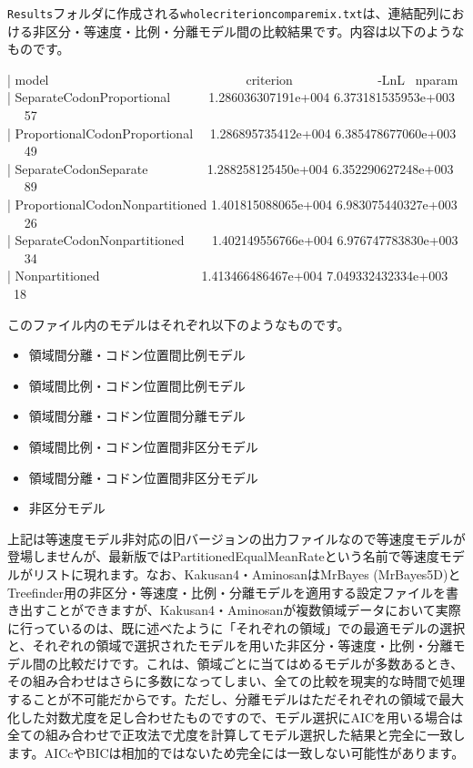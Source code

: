 \documentclass[titlepage,10pt,a4paper]{jsbook}
\newenvironment{content}{\begin{shaded}\vspace{-1em}\raggedright\ttfamily\footnotesize\setlength{\baselineskip}{1.4em}}{\end{shaded}\vspace{-1em}}
\begin{document}
\texttt{Results}フォルダに作成される\texttt{whole{\textunderscore}criterion{\textunderscore}comparemix.txt}は、連結配列における非区分・等速度・比例・分離モデル間の比較結果です。内容は以下のようなものです。
\begin{content}
| model~ ~ ~ ~ ~ ~ ~ ~ ~ ~ ~ ~ ~ ~ ~ ~ ~ ~ ~criterion~ ~ ~ ~ ~ ~ ~ ~ -LnL~ nparam\\
| Separate{\textunderscore}CodonProportional~ ~ ~ ~1.286036307191e+004 6.373181535953e+003~ ~ ~57\\
| Proportional{\textunderscore}CodonProportional~ ~1.286895735412e+004 6.385478677060e+003~ ~ ~49\\
| Separate{\textunderscore}CodonSeparate~ ~ ~ ~ ~ ~1.288258125450e+004 6.352290627248e+003~ ~ ~89\\
| Proportional{\textunderscore}CodonNonpartitioned 1.401815088065e+004 6.983075440327e+003~ ~ ~26\\
| Separate{\textunderscore}CodonNonpartitioned~ ~ ~1.402149556766e+004 6.976747783830e+003~ ~ ~34\\
| Nonpartitioned~ ~ ~ ~ ~ ~ ~ ~ ~ ~1.413466486467e+004 7.049332432334e+003~ ~ ~18
\end{content}
このファイル内のモデルはそれぞれ以下のようなものです。
\begin{itemize}\small\setlength{\baselineskip}{1.1em}
\item 領域間分離・コドン位置間比例モデル
\item 領域間比例・コドン位置間比例モデル
\item 領域間分離・コドン位置間分離モデル
\item 領域間比例・コドン位置間非区分モデル
\item 領域間分離・コドン位置間非区分モデル
\item 非区分モデル
\end{itemize}
上記は等速度モデル非対応の旧バージョンの出力ファイルなので等速度モデルが登場しませんが、最新版ではPartitionedEqualMeanRateという名前で等速度モデルがリストに現れます。なお、Kakusan4・AminosanはMrBayes (MrBayes5D)とTreefinder用の非区分・等速度・比例・分離モデルを適用する設定ファイルを書き出すことができますが、Kakusan4・Aminosanが複数領域データにおいて実際に行っているのは、既に述べたように「それぞれの領域」での最適モデルの選択と、それぞれの領域で選択されたモデルを用いた非区分・等速度・比例・分離モデル間の比較だけです。これは、領域ごとに当てはめるモデルが多数あるとき、その組み合わせはさらに多数になってしまい、全ての比較を現実的な時間で処理することが不可能だからです。ただし、分離モデルはただそれぞれの領域で最大化した対数尤度を足し合わせたものですので、モデル選択にAICを用いる場合は全ての組み合わせで正攻法で尤度を計算してモデル選択した結果と完全に一致します。AICcやBICは相加的ではないため完全には一致しない可能性があります。
\end{document}
